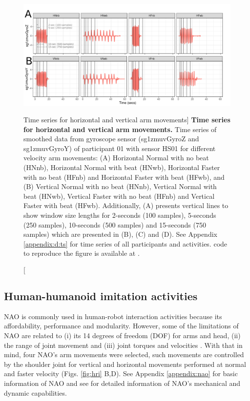 \begin{figure}
  \centering
  \includegraphics[width=1.0\textwidth]{fig_4_02}
    \caption
	[Time series for horizontal and vertical arm movements]{
	{\bf Time series for horizontal and vertical arm movements.} 
		Time series of smoothed data from gyroscope sensor 
		(sg1zmuvGyroZ and sg1zmuvGyroY) of participant 01 
		with sensor HS01 for different velocity arm movements: 
		(A) Horizontal Normal with no beat (HNnb),
			Horizontal Normal with beat (HNwb), 
			Horizontal Faster with no beat (HFnb) and
			Horizontal Faster with beat (HFwb), and 
		(B) Vertical Normal with no beat (HNnb),
			Vertical Normal with beat (HNwb), 
			Vertical Faster with no beat (HFnb) and
			Vertical Faster with beat (HFwb).
		Additionally, (A) presents vertical lines 
		to show window size lengths for 2-seconds 
		(100 samples), 5-seconds (250 samples), 
		10-seconds (500 samples) and 15-seconds (750 samples)
		which are presented in (B), (C) and (D).
	See Appendix \ref{appendix:d:ts} for 
	time series of all participants and activities. 
	\R code to reproduce the figure is available at 
	.
        }
	\label{fig:hii-sts}
\end{figure}

\subsection{Human-humanoid imitation activities} \label{sec:experiment:hhi}
NAO is commonly used in human-robot interaction activities because 
its affordability, performance and modularity.
However, some of the limitations of NAO are related to 
(i) its 14 degrees of freedom (DOF) for arms and head,
(ii) the range of joint movement and 
(iii) joint torques and velocities \citep{gouaillier2009}. 
With that in mind, four NAO's arm movements were selected,
such movements are controlled by the shoulder joint 
for vertical and horizontal movements performed at 
normal and faster velocity (Figs. \ref{fig:hri} B,D).
See Appendix \ref{appendix:nao} for basic information 
of NAO and see \cite{gouaillier2009} 
for detailed information of NAO's mechanical 
and dynamic capabilities.

